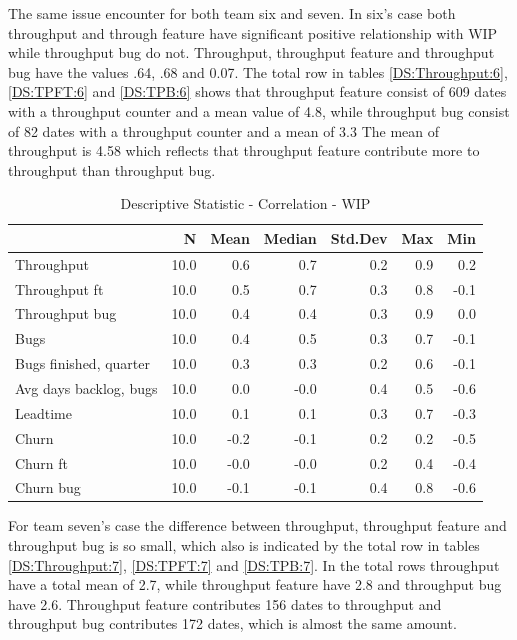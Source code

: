\documentclass[UKenglish]{ifimaster}  %
\begin{document}
The same issue encounter for both team six and seven. In six's case both throughput and through feature have significant positive relationship with WIP while throughput bug do not. Throughput, throughput feature and throughput bug have the values .64, .68 and 0.07. The total row in tables \ref{DS:Throughput:6},  \ref{DS:TPFT:6} and \ref{DS:TPB:6} shows that throughput feature consist of 609 dates with a throughput counter and a mean value of 4.8, while throughput bug consist of 82 dates with a throughput counter and a mean of 3.3 The mean of throughput is 4.58 which reflects that throughput feature contribute more to throughput than throughput bug.

\begin{table}[!htbp]
 \centering
 \begin{tabular}{ | l | r | r | r | r | r | r | }
 \hline
& N & Mean & Median & Std.Dev & Max & Min \\ \hline
Throughput  & 10.0 & 0.6 & 0.7 & 0.2 & 0.9 & 0.2\\ \hline
Throughput ft  & 10.0 & 0.5 & 0.7 & 0.3 & 0.8 & -0.1\\ \hline
Throughput bug  & 10.0 & 0.4 & 0.4 & 0.3 & 0.9 & 0.0\\ \hline
Bugs  & 10.0 & 0.4 & 0.5 & 0.3 & 0.7 & -0.1\\ \hline
Bugs finished, quarter  & 10.0 & 0.3 & 0.3 & 0.2 & 0.6 & -0.1\\ \hline
Avg days backlog, bugs  & 10.0 & 0.0 & -0.0 & 0.4 & 0.5 & -0.6\\ \hline
Leadtime  & 10.0 & 0.1 & 0.1 & 0.3 & 0.7 & -0.3\\ \hline
Churn  & 10.0 & -0.2 & -0.1 & 0.2 & 0.2 & -0.5\\ \hline
Churn ft  & 10.0 & -0.0 & -0.0 & 0.2 & 0.4 & -0.4\\ \hline
Churn bug  & 10.0 & -0.1 & -0.1 & 0.4 & 0.8 & -0.6\\ \hline
\end{tabular}
 \caption{Descriptive Statistic - Correlation - WIP}
 \label{DS:corr:WIP}
 \end{table}

For team seven's case the difference between throughput, throughput feature and throughput bug is so small, which also is indicated by the total row in tables \ref{DS:Throughput:7},  \ref{DS:TPFT:7} and \ref{DS:TPB:7}. In the total rows throughput have a total mean of 2.7, while throughput feature have 2.8 and throughput bug have 2.6. Throughput feature contributes 156 dates to throughput and throughput bug contributes 172 dates, which is almost the same amount.
\end{document}
